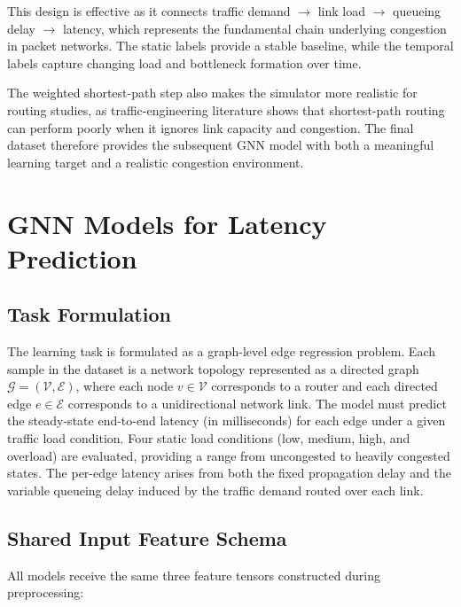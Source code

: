 \documentclass[12pt]{article}
\begin{document}
This design is effective as it connects traffic demand $\rightarrow$ link load $\rightarrow$ queueing delay $\rightarrow$ latency, which represents the fundamental chain underlying congestion in packet networks. The static labels provide a stable baseline, while the temporal labels capture changing load and bottleneck formation over time. 

The weighted shortest-path step also makes the simulator more realistic for routing studies, as traffic-engineering literature shows that shortest-path routing can perform poorly when it ignores link capacity and congestion. The final dataset therefore provides the subsequent GNN model with both a meaningful learning target and a realistic congestion environment.

\section{GNN Models for Latency Prediction}
\label{sec:models}

\subsection{Task Formulation}
The learning task is formulated as a graph-level edge regression problem. Each sample in the dataset is a network topology represented as a directed graph $\mathcal{G} = (\mathcal{V}, \mathcal{E})$, where each node $v \in \mathcal{V}$ corresponds to a router and each directed edge $e \in \mathcal{E}$ corresponds to a unidirectional network link. The model must predict the steady-state end-to-end latency (in milliseconds) for each edge under a given traffic load condition. Four static load conditions (low, medium, high, and overload) are evaluated, providing a range from uncongested to heavily congested states. The per-edge latency arises from both the fixed propagation delay and the variable queueing delay induced by the traffic demand routed over each link.

\subsection{Shared Input Feature Schema}
All models receive the same three feature tensors constructed during preprocessing:
\end{document}
